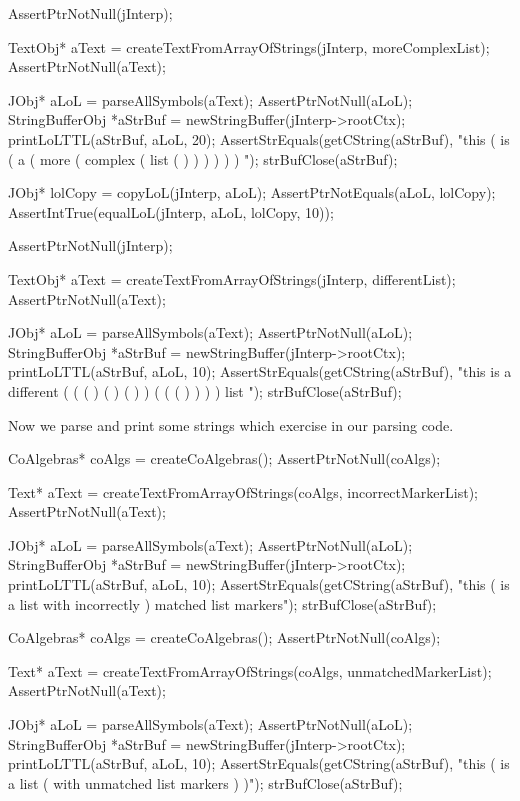 \startCTest
  AssertPtrNotNull(jInterp);

  TextObj* aText =
    createTextFromArrayOfStrings(jInterp, moreComplexList);
  AssertPtrNotNull(aText);

  JObj* aLoL = parseAllSymbols(aText);
  AssertPtrNotNull(aLoL);
  StringBufferObj *aStrBuf = newStringBuffer(jInterp->rootCtx);
  printLoLTTL(aStrBuf, aLoL, 20);
  AssertStrEquals(getCString(aStrBuf),
    "this ( is ( a ( more ( complex ( list ( ) ) ) ) ) ) ");
  strBufClose(aStrBuf);
  
  JObj* lolCopy = copyLoL(jInterp, aLoL);
  AssertPtrNotEquals(aLoL, lolCopy);
  AssertIntTrue(equalLoL(jInterp, aLoL, lolCopy, 10));
\stopCTest
\stopTestCase

\startCTest
  AssertPtrNotNull(jInterp);

  TextObj* aText =
    createTextFromArrayOfStrings(jInterp, differentList);
  AssertPtrNotNull(aText);

  JObj* aLoL = parseAllSymbols(aText);
  AssertPtrNotNull(aLoL);
  StringBufferObj *aStrBuf = newStringBuffer(jInterp->rootCtx);
  printLoLTTL(aStrBuf, aLoL, 10);
  AssertStrEquals(getCString(aStrBuf),
    "this is a different ( ( ( ) ( ) ( ) ) ( ( ( ) ) ) ) list ");
  strBufClose(aStrBuf);
\stopCTest
\stopTestCase

Now we parse and print some strings which exercise  
in our parsing code. 

\startCTest
  CoAlgebras* coAlgs = createCoAlgebras();
  AssertPtrNotNull(coAlgs);

  Text* aText = createTextFromArrayOfStrings(coAlgs, incorrectMarkerList);
  AssertPtrNotNull(aText);

  JObj* aLoL = parseAllSymbols(aText);
  AssertPtrNotNull(aLoL);
  StringBufferObj *aStrBuf = newStringBuffer(jInterp->rootCtx);
  printLoLTTL(aStrBuf, aLoL, 10);
  AssertStrEquals(getCString(aStrBuf),
    "this ( is a list with incorrectly ) matched list markers");
  strBufClose(aStrBuf);
\stopCTest
\ignoreTestCase

\startCTest
  CoAlgebras* coAlgs = createCoAlgebras();
  AssertPtrNotNull(coAlgs);

  Text* aText = createTextFromArrayOfStrings(coAlgs, unmatchedMarkerList);
  AssertPtrNotNull(aText);

  JObj* aLoL = parseAllSymbols(aText);
  AssertPtrNotNull(aLoL);
  StringBufferObj *aStrBuf = newStringBuffer(jInterp->rootCtx);
  printLoLTTL(aStrBuf, aLoL, 10);
  AssertStrEquals(getCString(aStrBuf),
    "this ( is a list ( with unmatched list markers ) )");
  strBufClose(aStrBuf);
\stopCTest
\ignoreTestCase
\stopTestSuite

